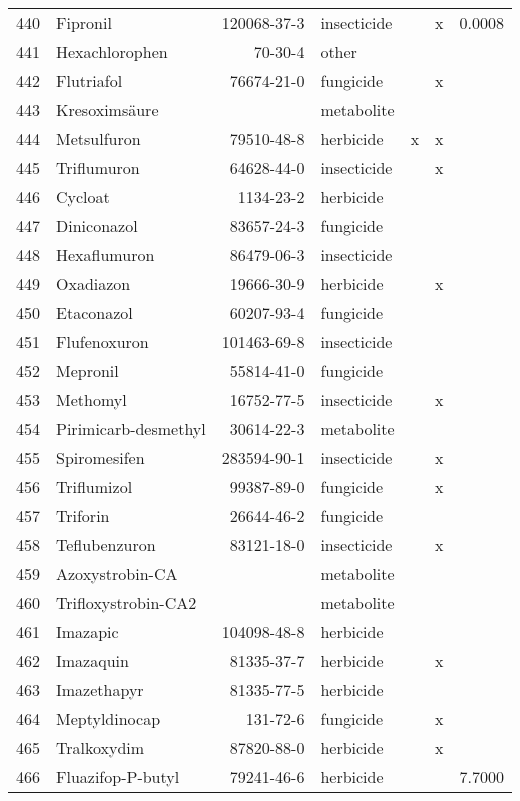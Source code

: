 \begin{longtable}{lp{3cm}rlp{0.5cm}p{0.5cm}p{1.5cm}}
  440 & Fipronil & 120068-37-3 & insecticide &  & x & 0.0008 \\ 
  441 & Hexachlorophen & 70-30-4 & other &  &  &  \\ 
  442 & Flutriafol & 76674-21-0 & fungicide &  & x &  \\ 
  443 & Kresoximsäure &  & metabolite &  &  &  \\ 
  444 & Metsulfuron & 79510-48-8 & herbicide & x & x &  \\ 
  445 & Triflumuron & 64628-44-0 & insecticide &  & x &  \\ 
  446 & Cycloat & 1134-23-2 & herbicide &  &  &  \\ 
  447 & Diniconazol & 83657-24-3 & fungicide &  &  &  \\ 
  448 & Hexaflumuron & 86479-06-3 & insecticide &  &  &  \\ 
  449 & Oxadiazon & 19666-30-9 & herbicide &  & x &  \\ 
  450 & Etaconazol & 60207-93-4 & fungicide &  &  &  \\ 
  451 & Flufenoxuron & 101463-69-8 & insecticide &  &  &  \\ 
  452 & Mepronil & 55814-41-0 & fungicide &  &  &  \\ 
  453 & Methomyl & 16752-77-5 & insecticide &  & x &  \\ 
  454 & Pirimicarb-desmethyl & 30614-22-3 & metabolite &  &  &  \\ 
  455 & Spiromesifen & 283594-90-1 & insecticide &  & x &  \\ 
  456 & Triflumizol & 99387-89-0 & fungicide &  & x &  \\ 
  457 & Triforin & 26644-46-2 & fungicide &  &  &  \\ 
  458 & Teflubenzuron & 83121-18-0 & insecticide &  & x &  \\ 
  459 & Azoxystrobin-CA &  & metabolite &  &  &  \\ 
  460 & Trifloxystrobin-CA2 &  & metabolite &  &  &  \\ 
  461 & Imazapic & 104098-48-8 & herbicide &  &  &  \\ 
  462 & Imazaquin & 81335-37-7 & herbicide &  & x &  \\ 
  463 & Imazethapyr & 81335-77-5 & herbicide &  &  &  \\ 
  464 & Meptyldinocap & 131-72-6 & fungicide &  & x &  \\ 
  465 & Tralkoxydim & 87820-88-0 & herbicide &  & x &  \\ 
  466 & Fluazifop-P-butyl & 79241-46-6 & herbicide &  &  & 7.7000 \\ 

\end{longtable}
